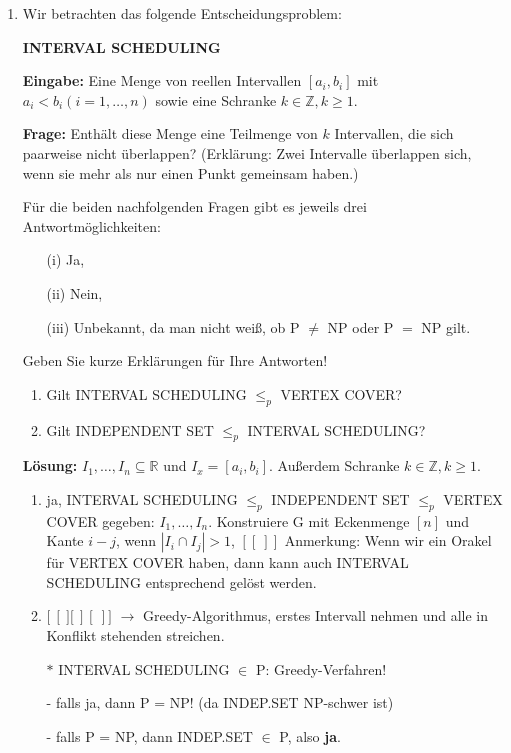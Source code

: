 \documentclass[12pt,a4paper]{scrreprt}
\newcommand{\prob}[1]{\vspace{.5\baselineskip}\begin{addmargin}[15pt]{0pt}\textbf{#1}\end{addmargin}}
\newcommand{\ein}[1]{\vspace{.5\baselineskip}\begin{addmargin}[15pt]{0pt}\textbf{Eingabe: }#1\end{addmargin}}
\newcommand{\fra}[1]{\vspace{.5\baselineskip}\begin{addmargin}[15pt]{0pt}\textbf{Frage: }#1\end{addmargin}}
\newcommand{\loesung}[1]{\vspace{.5\baselineskip}\begin{addmargin}[0pt]{0pt}\textbf{Lösung: }#1\end{addmargin}}
\newcommand{\pr}{$\leq_p$ }%
\begin{document}
\begin{enumerate}
\item Wir betrachten das folgende Entscheidungsproblem:

	\prob{INTERVAL SCHEDULING}

	\ein{Eine Menge von reellen Intervallen $[a_i, b_i]$ mit $a_i < b_i (i=1,\ldots,n)$ sowie eine Schranke $k \in \mathds{Z}, k \geq 1$.}

	\fra{Enthält diese Menge eine Teilmenge von $k$ Intervallen, die sich paarweise nicht überlappen? (Erklärung: Zwei Intervalle überlappen sich, wenn sie mehr als nur einen Punkt gemeinsam haben.)}

\item[] Für die beiden nachfolgenden Fragen gibt es jeweils drei Antwortmöglichkeiten:
\begin{enumerate}
	\item[(i)] Ja,
	\item[(ii)] Nein,
	\item[(iii)] Unbekannt, da man nicht weiß, ob P $\neq$ NP oder P $=$ NP gilt.
\end{enumerate}

Geben Sie kurze Erklärungen für Ihre Antworten!
\begin{enumerate}
	\item Gilt INTERVAL SCHEDULING \pr VERTEX COVER?
	\item Gilt INDEPENDENT SET \pr INTERVAL SCHEDULING?
\end{enumerate}

\item[]\loesung{
$I_1,\ldots, I_n \subseteq \mathds{R}$ und $I_x = [a_i,b_i]$. Außerdem Schranke $k \in \mathds{Z}, k \geq 1$.
\begin{enumerate}
	\item ja, INTERVAL SCHEDULING \pr INDEPENDENT SET \pr VERTEX COVER
	gegeben: $I_1,\ldots, I_n$. Konstruiere G mit Eckenmenge $[n]$ und Kante $i-j$, wenn $|I_i \cap I_j| > 1$, $[[\ ]]$
	Anmerkung: Wenn wir ein Orakel für VERTEX COVER haben, dann kann auch INTERVAL SCHEDULING entsprechend gelöst werden.
	\item $\big[\ [\ \big]\big[\ ][\ ]\big]$ $\rightarrow$ Greedy-Algorithmus, erstes Intervall nehmen und alle in Konflikt stehenden streichen.
	
	$\ast$ INTERVAL SCHEDULING $\in$ P: Greedy-Verfahren!
	
	- falls ja, dann P = NP! (da INDEP.SET NP-schwer ist)
	
	- falls P = NP, dann INDEP.SET $\in$ P, also \textbf{ja}.
\end{enumerate}

}
\end{enumerate}
\end{document}
